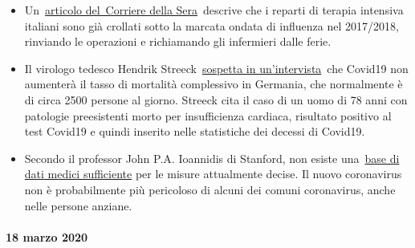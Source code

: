 \begin{itemize}
\tightlist
\item
  Un~\href{https://milano.corriere.it/notizie/cronaca/18_gennaio_10/milano-terapie-intensive-collasso-l-influenza-gia-48-malati-gravi-molte-operazioni-rinviate-c9dc43a6-f5d1-11e7-9b06-fe054c3be5b2.shtml}{articolo
  del~Corriere della Sera}~descrive che i reparti di terapia intensiva
  italiani sono già crollati sotto la marcata ondata di influenza nel
  2017/2018, rinviando le operazioni e richiamando gli infermieri dalle
  ferie.
\item
  Il virologo tedesco Hendrik
  Streeck~\href{https://www.faz.net/aktuell/gesellschaft/gesundheit/coronavirus/virologe-hendrik-streeck-ueber-corona-neue-symptome-entdeckt-16681450.html?printPagedArticle=true\#pageIndex_2}{sospetta
  in un'intervista}~che Covid19 non aumenterà il tasso di mortalità
  complessivo in Germania, che normalmente è di circa 2500 persone al
  giorno. Streeck cita il caso di un uomo di 78 anni con patologie
  preesistenti morto per insufficienza cardiaca, risultato positivo al
  test Covid19 e quindi inserito nelle statistiche dei decessi di
  Covid19.
\item
  Secondo il professor John P.A. Ioannidis di Stanford, non esiste
  una~\href{https://www.statnews.com/2020/03/17/a-fiasco-in-the-making-as-the-coronavirus-pandemic-takes-hold-we-are-making-decisions-without-reliable-data/}{base
  di dati medici sufficiente} per le misure attualmente decise. Il nuovo
  coronavirus non è probabilmente più pericoloso di alcuni dei comuni
  coronavirus, anche nelle persone anziane.
\end{itemize}

\hypertarget{18-marzo-2020}{%
\paragraph{18 marzo 2020}\label{18-marzo-2020}}

